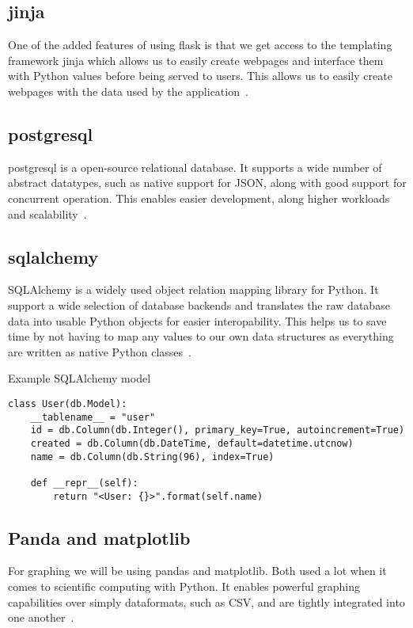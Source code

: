 \documentclass[../Main/thesis.tex]{subfiles}
\begin{document}
\subsection*{jinja}
One of the added features of using flask is that we get access to the templating
framework jinja which allows us to easily create webpages and interface them
with Python values before being served to users. This allows us to easily create
webpages with the data used by the application~\cite{jinja}.

\subsection*{postgresql}
postgresql is a open-source relational database. It supports a wide number of
abstract datatypes, such as native support for JSON, along with good support for
concurrent operation. This enables easier development, along higher workloads
and scalability~\cite{pgsql}.

\subsection*{sqlalchemy}
SQLAlchemy is a widely used object relation mapping library for Python. It
support a wide selection of database backends and translates the raw database
data into usable Python objects for easier interopability. This helps us to save
time by not having to map any values to our own data structures as everything
are written as native Python classes~\cite{sqlalchemy}.

\begin{listing}[ht]
\caption{Example SQLAlchemy model}
\label{lst:sqlalchemy}
\begin{verbatim}
class User(db.Model):
    __tablename__ = "user"
    id = db.Column(db.Integer(), primary_key=True, autoincrement=True)
    created = db.Column(db.DateTime, default=datetime.utcnow)
    name = db.Column(db.String(96), index=True)

    def __repr__(self):
        return "<User: {}>".format(self.name)
\end{verbatim}
\end{listing}


\subsection*{Panda and matplotlib}
For graphing we will be using pandas and matplotlib. Both used a lot when it
comes to scientific computing with Python. It enables powerful graphing
capabilities over simply dataformats, such as CSV, and are tightly integrated
into one another~\cite{pandas}\cite{matplotlib}.
\end{document}
